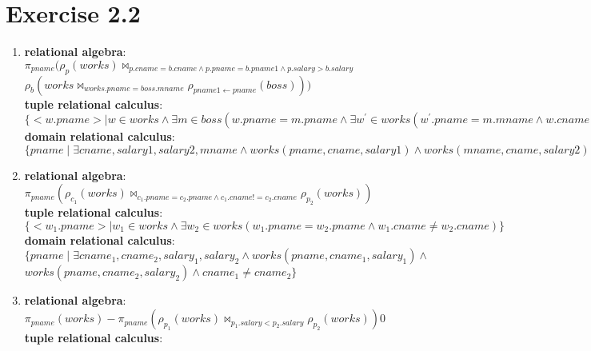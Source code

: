 \documentclass[12pt]{article}
\begin{document}
	\section{Exercise 2.2}
	\begin{enumerate}[label = 2.2.\arabic*]
		\item %
			\textbf{relational algebra}: \\
			$\pi_{pname}( \rho_{p}(works) \bowtie_{p.cname = b.cname \land p.pname = b.pname1 \land p.salary > b.salary}$ \\
			\hspace*{2cm}$ \rho_{b}(works \bowtie_{works.pname = boss.mname} \rho_{pname1\leftarrow pname}(boss) ) )$ \\
			\textbf{tuple relational calculus}:\\
			$\{ <w.pname> \mid w \in works \land \exists m \in boss (w.pname = m.pname \land \exists w^\prime \in works ( w^\prime.pname =m.mname \land w.cname = w^\prime.cname \land w.salary > w^\prime.salary ))  \}$ \\
			\textbf{domain relational calculus}: \\
			$\{ pname \mid \exists cname, salary1, salary2,mname \land works(pname,cname,salary1) \land works(mname, cname, salary2) \land boss(pname, cname) \land salary1 > salary2\}$
		\item 
			\textbf{relational algebra}:\\
			$\pi_{pname}( \rho_{c_1}(works) \bowtie_{c_1.pname=c_2.pname \land c_1.cname != c_2.cname} \rho_{p_2}(works) )$ \\
			\textbf{tuple relational calculus}:\\
			$\{ <w_1.pname> \mid w_1\in works \land \exists w_2 \in works( w_1.pname=w_2.pname \land w_1.cname \neq w_2.cname) \} $ \\
			\textbf{domain relational calculus}:\\
			$\{ pname \mid \exists cname_1, cname_2, salary_1, salary_2 \land works(pname, cname_1, salary_1) \land$ \\
			\hspace*{2cm}$ works(pname, cname_2, salary_2) \land cname_1 \neq cname_2 \} $ \\
		\item 
			\textbf{relational algebra}:\\
			$\pi_{pname}(works) - \pi_{pname}(\rho_{p_1}(works) \bowtie_{p_1.salary < p_2.salary} \rho_{p_2}(works))0$ \\
			\textbf{tuple relational calculus}:\\

\end{enumerate}
\end{document}
